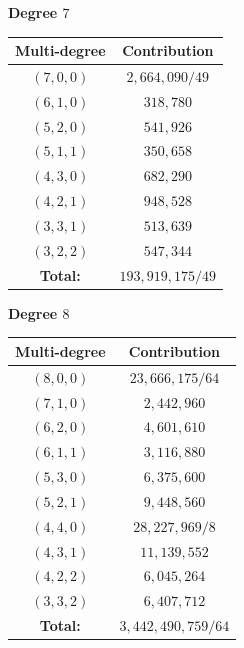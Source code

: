 \documentclass[11pt]{amsart}
\theoremstyle{definition}
\theoremstyle{definition}
\begin{document}
\begin{center}
\begin{minipage}[t]{0.4\textwidth}
\noindent \center\textbf{Degree $7$}\\
\begin{tabular}{| c | c |}
	\hline
	\textbf{Multi-degree} & \textbf{Contribution} \\
	\hline \hline
	$(7,0,0)$ & $2,\!664,\!090/49$ \\
	\hline
	$(6,1,0)$ & $318,\!780$ \\
	\hline 
	$(5,2,0)$ & $541,\!926$ \\
	\hline
	$(5,1,1)$ & $350,\!658$  \\
	\hline
	$(4,3,0)$ & $682,\!290$ \\
	\hline
	$(4,2,1)$ & $948,\!528$ \\
	\hline
	$(3,3,1)$ & $513,\!639$ \\
	\hline
	$(3,2,2)$ & $547,\!344$ \\
	\hline\hline
	\textbf{Total:} &  $193,\!919,\!175/49$ \\
	\hline
\end{tabular}
\end{minipage}
\begin{minipage}[t]{0.4\textwidth}
\noindent \center\textbf{Degree $8$}\\
\begin{tabular}{| c | c |}
	\hline
	\textbf{Multi-degree} & \textbf{Contribution} \\
	\hline \hline
	$(8,0,0)$ & $23,\!666,\!175/64$ \\
	\hline
	$(7,1,0)$ & $2,\!442,\!960$ \\
	\hline 
	$(6,2,0)$ & $4,\!601,\!610$ \\
	\hline
	$(6,1,1)$ & $3,\!116,\!880$ \\
	\hline
	$(5,3,0)$ & $6,\!375,\!600$ \\
	\hline
	$(5,2,1)$ & $9,\!448,\!560$ \\
	\hline
	$(4,4,0)$ & $28,\!227,\!969/8$ \\
	\hline
	$(4,3,1)$ & $11,\!139,\!552$ \\
	\hline
	$(4,2,2)$ & $6,\!045,\!264$ \\
	\hline
	$(3,3,2)$ & $6,\!407,\!712$ \\
	\hline\hline
	\textbf{Total:} &  $3,\!442,\!490,\!759/64$ \\
	\hline
\end{tabular}
\end{minipage}
\end{center}
\end{document}
